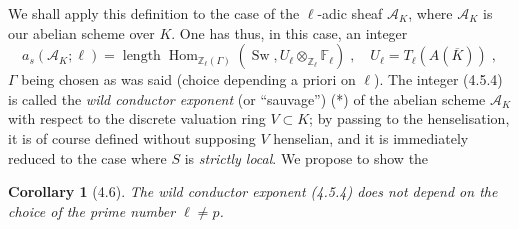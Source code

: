 \documentclass[11pt]{article}
\newtheorem{corollaire}[proposition]{Corollary}
\newcommand{\Hom}{\operatorname{Hom}}
\newcommand{\ZZ}{\mathbb Z}
\newcommand{\FF}{\mathbb F}
\newcommand{\Tl}{T_{\ell}}
\newcommand{\sA}{\mathscr A}
\newcommand{\longueur}{\operatorname{length}}
\begin{document}
We shall apply this definition to the case of the $\ell$-adic sheaf
$\sA_K$, where $\sA_K$ is our abelian scheme over $K$. One has thus, in
this case, an integer
\begin{equation}
a_s(\sA_K; \ell) = \longueur
\Hom_{\ZZ_{\ell}(\Gamma)}(\operatorname{Sw}, U_{\ell} \otimes_{\ZZ_{\ell}}
\FF_{\ell}) \; , \quad U_{\ell} = \Tl(A(\overline{K})) \; ,
\end{equation}
$\Gamma$ being chosen as was said (choice depending a priori on $\ell$).
The integer (4.5.4) is called the \emph{wild conductor exponent} (or
``sauvage'') (*) of the abelian scheme $\sA_K$ with respect to the
discrete valuation ring $V \subset K$; by passing to the henselisation, it
is of course defined without supposing $V$ henselian, and it is
immediately reduced to the case where $S$ is \emph{strictly local}. We
propose to show the

\begin{corollaire}[4.6]
The wild conductor exponent (4.5.4) does not depend on the choice of
the prime number $\ell \neq p$.
\end{corollaire}
\end{document}
